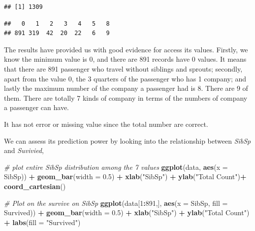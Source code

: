 \documentclass[
]{book}
\newenvironment{Shaded}{\begin{snugshade}}{\end{snugshade}}
\newcommand{\CommentTok}[1]{\textcolor[rgb]{0.56,0.35,0.01}{\textit{#1}}}
\newcommand{\DataTypeTok}[1]{\textcolor[rgb]{0.13,0.29,0.53}{#1}}
\newcommand{\DecValTok}[1]{\textcolor[rgb]{0.00,0.00,0.81}{#1}}
\newcommand{\FloatTok}[1]{\textcolor[rgb]{0.00,0.00,0.81}{#1}}
\newcommand{\KeywordTok}[1]{\textcolor[rgb]{0.13,0.29,0.53}{\textbf{#1}}}
\newcommand{\NormalTok}[1]{#1}
\newcommand{\OperatorTok}[1]{\textcolor[rgb]{0.81,0.36,0.00}{\textbf{#1}}}
\newcommand{\StringTok}[1]{\textcolor[rgb]{0.31,0.60,0.02}{#1}}
\begin{document}
\begin{verbatim}
## [1] 1309
\end{verbatim}

\begin{Shaded}
\end{Shaded}

\begin{verbatim}
##   0   1   2   3   4   5   8 
## 891 319  42  20  22   6   9
\end{verbatim}

The results have provided us with good evidence for access its values. Firstly, we know the minimum value is 0, and there are 891 records have 0 values. It means that there are 891 passenger who travel without siblings and sprouts; secondly, apart from the value 0, the 3 quarters of the passenger who has 1 company; and lastly the maximum number of the company a passenger had is 8. There are 9 of them. There are totally 7 kinds of company in terms of the numbers of company a passenger can have.

It has not error or missing value since the total number are correct.

We can assess its prediction power by looking into the relationship between \emph{SibSp} and \emph{Suvivied},

\begin{Shaded}
\begin{Highlighting}[]
\CommentTok{# plot entire SibSp distribution among the 7 values}
\KeywordTok{ggplot}\NormalTok{(data, }\KeywordTok{aes}\NormalTok{(}\DataTypeTok{x =}\NormalTok{ SibSp)) }\OperatorTok{+}
\StringTok{  }\KeywordTok{geom_bar}\NormalTok{(}\DataTypeTok{width =} \FloatTok{0.5}\NormalTok{) }\OperatorTok{+}
\StringTok{  }\KeywordTok{xlab}\NormalTok{(}\StringTok{"SibSp"}\NormalTok{) }\OperatorTok{+}
\StringTok{  }\KeywordTok{ylab}\NormalTok{(}\StringTok{"Total Count"}\NormalTok{)}\OperatorTok{+}
\StringTok{  }\KeywordTok{coord_cartesian}\NormalTok{()}

\CommentTok{# Plot on the survive on SibSp}
\KeywordTok{ggplot}\NormalTok{(data[}\DecValTok{1}\OperatorTok{:}\DecValTok{891}\NormalTok{,], }\KeywordTok{aes}\NormalTok{(}\DataTypeTok{x =}\NormalTok{ SibSp, }\DataTypeTok{fill =}\NormalTok{ Survived)) }\OperatorTok{+}
\StringTok{  }\KeywordTok{geom_bar}\NormalTok{(}\DataTypeTok{width =} \FloatTok{0.5}\NormalTok{) }\OperatorTok{+}
\StringTok{  }\KeywordTok{xlab}\NormalTok{(}\StringTok{"SibSp"}\NormalTok{) }\OperatorTok{+}
\StringTok{  }\KeywordTok{ylab}\NormalTok{(}\StringTok{"Total Count"}\NormalTok{)  }\OperatorTok{+}
\StringTok{  }\KeywordTok{labs}\NormalTok{(}\DataTypeTok{fill =} \StringTok{"Survived"}\NormalTok{)}
\end{Highlighting}
\end{Shaded}
\end{document}
